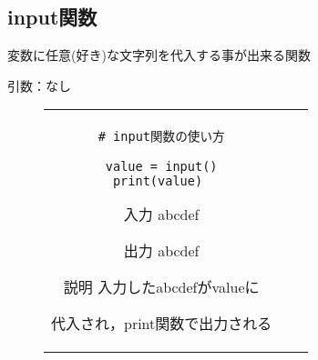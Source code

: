\documentclass{jsarticle}
\begin{document}
\subsection{input関数}
変数に任意(好き)な文字列を代入する事が出来る関数 \par
引数：なし
\vspace{-5mm}
\begin{figure}[h]
	\begin{tabular}{ccc}
		\begin{minipage}[t]{.4\textwidth}
			\begin{lstlisting}[caption=input関数]
# input関数の使い方

value = input()
print(value) \end{lstlisting}
		\end{minipage} \hspace{5mm}
		\begin{minipage}[t]{.2\textwidth}
			\begin{itembox}[l]{入力}
				abcdef
			\end{itembox}
			\begin{itembox}[l]{出力}
				abcdef
			\end{itembox}
		\end{minipage} \hspace{5mm}
		\begin{minipage}[t]{.35\textwidth}
			\begin{itembox}[l]{説明}
				入力したabcdefがvalueに \par 代入され，print関数で出力される
			\end{itembox}
		\end{minipage}
	\end{tabular}
\end{figure}
\end{document}
